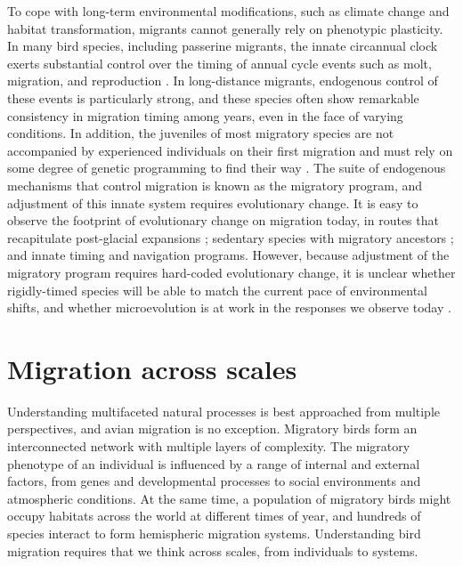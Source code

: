 \documentclass[a4paper, nobind]{templates/ociamthesis}
\begin{document}
To cope with long-term environmental modifications, such as climate change and habitat transformation, migrants cannot generally rely on phenotypic plasticity. In many bird species, including passerine migrants, the innate circannual clock exerts substantial control over the timing of annual cycle events such as molt, migration, and reproduction \autocite{gwinnerCircannualClocksAvian1996}. In long-distance migrants, endogenous control of these events is particularly strong, and these species often show remarkable consistency in migration timing among years, even in the face of varying conditions. In addition, the juveniles of most migratory species are not accompanied by experienced individuals on their first migration and must rely on some degree of genetic programming to find their way \autocite{newtonMigrationEcologyBirds2008}. The suite of endogenous mechanisms that control migration is known as the migratory program, and adjustment of this innate system requires evolutionary change. It is easy to observe the footprint of evolutionary change on migration today, in routes that recapitulate post-glacial expansions \autocite[e.g.~][]{rueggClimateChangeOrigin2006}; sedentary species with migratory ancestors \autocite[e.g.~][]{wingerAncestryEvolutionSeasonal2012}; and innate timing and navigation programs. However, because adjustment of the migratory program requires hard-coded evolutionary change, it is unclear whether rigidly-timed species will be able to match the current pace of environmental shifts, and whether microevolution is at work in the responses we observe today \autocite{gienappResponsesClimateChange2007,charmantierClimateChangeTiming2014,vanbuskirkPhenotypicPlasticityAlone2012}.

\hypertarget{migration-across-scales}{%
\section*{Migration across scales}\label{migration-across-scales}}

Understanding multifaceted natural processes is best approached from multiple perspectives, and avian migration is no exception. Migratory birds form an interconnected network with multiple layers of complexity. The migratory phenotype of an individual is influenced by a range of internal and external factors, from genes and developmental processes to social environments and atmospheric conditions. At the same time, a population of migratory birds might occupy habitats across the world at different times of year, and hundreds of species interact to form hemispheric migration systems. Understanding bird migration requires that we think across scales, from individuals to systems.
\end{document}
